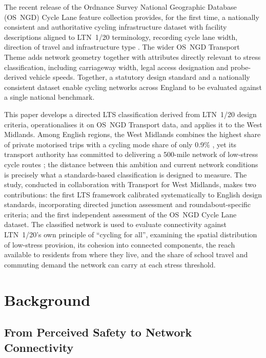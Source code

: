 \documentclass[final,5p,times,twocolumn,authoryear]{elsarticle}
\begin{document}
The recent release of the Ordnance Survey National Geographic Database (OS~NGD) Cycle Lane feature collection provides, for the first time, a nationally consistent and authoritative cycling infrastructure dataset with facility descriptions aligned to LTN~1/20 terminology, recording cycle lane width, direction of travel and infrastructure type \citep{ordnancesurvey2026e}. The wider OS~NGD Transport Theme adds network geometry together with attributes directly relevant to stress classification, including carriageway width, legal access designation and probe-derived vehicle speeds. Together, a statutory design standard and a nationally consistent dataset enable cycling networks across England to be evaluated against a single national benchmark.

This paper develops a directed LTS classification derived from LTN~1/20 design criteria, operationalises it on OS~NGD Transport data, and applies it to the West Midlands. Among English regions, the West Midlands combines the highest share of private motorised trips with a cycling mode share of only 0.9\% \citep{westmidlandscombinedauthority2024}, yet its transport authority has committed to delivering a 500-mile network of low-stress cycle routes \citep{westmidlandscombinedauthority2020}; the distance between this ambition and current network conditions is precisely what a standards-based classification is designed to measure. The study, conducted in collaboration with Transport for West Midlands, makes two contributions: the first LTS framework calibrated systematically to English design standards, incorporating directed junction assessment and roundabout-specific criteria; and the first independent assessment of the OS~NGD Cycle Lane dataset. The classified network is used to evaluate connectivity against LTN~1/20's own principle of ``cycling for all'', examining the spatial distribution of low-stress provision, its cohesion into connected components, the reach available to residents from where they live, and the share of school travel and commuting demand the network can carry at each stress threshold.

\section{Background}
\label{sec:background}

\subsection{From Perceived Safety to Network Connectivity}
\label{sec:perceived-safety}
\end{document}
